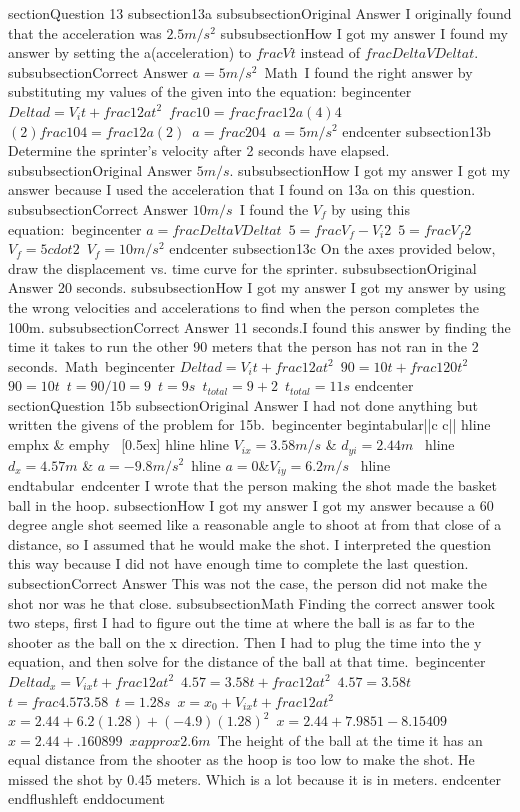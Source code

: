     section{Question 13}
	subsection{13a}
	subsubsection{Original Answer}
	I originally found that the acceleration was $2.5m/s^{2}$
	subsubsection{How I got my answer}
	I found my answer by setting the a(acceleration) to $frac{V}{t}$ instead of $frac{Delta V}{Delta t}$.
	subsubsection{Correct Answer}
	$a=5m/s^{2}$\
	Math\
	I found the right answer by substituting my values of the given into the equation:
	begin{center}
	 $Delta d = V_{i} t + frac{1}{2}at^{2}$\
	 $frac{10}=frac{frac{1}{2}a(4)}{4}$\
	 $(2)frac{10}{4}=frac{1}{2}a(2)$\
	 $a=frac{20}{4}$\
	 $a = 5 m/s^{2}$
	end{center}	 
	subsection{13b}
	Determine the sprinter's velocity after 2 seconds have elapsed.
	subsubsection{Original Answer}
	$5m/s$.
	subsubsection{How I got my answer}
	I got my answer because I used the acceleration that I found on 13a on this question.
	subsubsection{Correct Answer}
	$10m/s$\
	I found the $V_{f}$ by using this equation:\
	begin{center}
	$a=frac{Delta V}{Delta t}$\
	$5=frac{V_{f}-V_{i}}{2}$\
	$5=frac{V_{f}}{2}$\
	$V_{f}=5cdot{2}$\
	$V_{f}=10m/s^{2}$
	end{center}
	subsection{13c}
	On the axes provided below, draw the displacement vs. time curve for the sprinter.
	subsubsection{Original Answer}
	20 seconds.
	subsubsection{How I got my answer}
	I got my answer by using the wrong velocities and accelerations to find when the person completes the 100m. 
	subsubsection{Correct Answer}
	11 seconds.I found this answer by finding the time it takes to run the other 90 meters that the person has not ran in the 2 seconds.\
	Math\
	begin{center}
	$Delta d = V_{i} t + frac{1}{2}at^{2}$\
	$90=10t+frac{1}{2}0t^{2}$\
	$90=10t$\
	$t=90/10=9$\
	$t=9s$\
	$t_{total}=9+2$\
	$t_{total}=11s$
	end{center}
section{Question 15b}
	subsection{Original Answer}
	I had not done anything but written the givens of the problem for 15b.\
	begin{center}
begin{tabular}{||c c||} 
 hline
 emph{x} & emph{y} \ [0.5ex] 
 hline
 hline
$V_{ix} = 3.58m/s$ & $d_{yi} = 2.44m$ \ 
 hline
$d_{x} = 4.57m$ & $a = -9.8 m/s^{2}$\
 hline
$a=0$&$V_{iy} = 6.2 m/s$ \
 hline
end{tabular}\
end{center}
	I wrote that the person making the shot made the basket ball in the hoop.
	subsection{How I got my answer}
	I got my answer because a 60 degree angle shot seemed like a reasonable angle to shoot at from that close of a distance, so I assumed that he would make the shot. I interpreted the question this way because I did not have enough time to complete the last question.
	subsection{Correct Answer}
	This was not the case, the person did not make the shot nor was he that close. 
	subsubsection{Math}
	Finding the correct answer took two steps, first I had to figure out the time at where the ball is as far to the shooter as the ball on the x direction. Then I had to plug the time into the y equation, and then solve for the distance of the ball at that time.\
	begin{center}
	 $Delta d_{x} = V_{ix} t + frac{1}{2}at^{2}$\
	 $4.57=3.58t+frac{1}{2}at^{2}$\
	 $4.57=3.58t$\
	 $t=frac{4.57}{3.58}$\
	$t=1.28s$\
	 $x = x_{0}+V_{ix} t + frac{1}{2}at^{2}$\
	 $x =2.44+6.2(1.28) + (-4.9)(1.28)^{2}$\
	 $ x= 2.44+7.9851-8.15409$\
	 $ x=2.44+.160899$\
	 $xapprox 2.6m$\
	 The height of the ball at the time it has an equal distance from the shooter as the hoop is too low to make the shot. He missed the shot by 0.45 meters. Which  is a lot because it is in meters.
	end{center}
end{flushleft}
end{document}